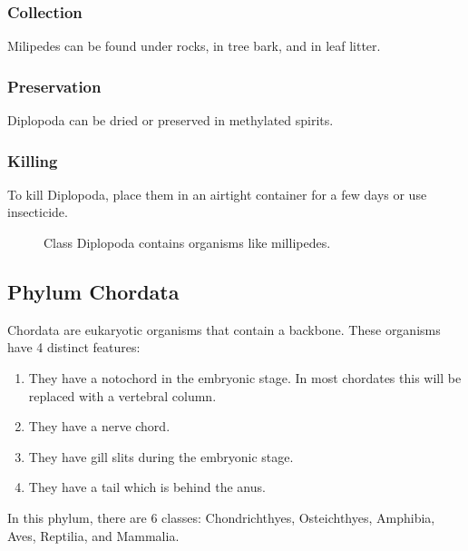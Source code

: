 \subsubsection{Collection}
Milipedes can be found under rocks, in tree bark, and in leaf litter.

\subsubsection{Preservation} 
Diplopoda can be dried or preserved in methylated spirits.

\subsubsection{Killing}
To kill Diplopoda, place them in an airtight container for a few days or use insecticide.
		
\begin{figure}[h]
\begin{center}
\def\svgwidth{6cm}

\caption{Class Diplopoda contains organisms like millipedes.}
\label{fig:Diplopoda}
\end{center}
\end{figure}


\subsection{Phylum Chordata}
Chordata are eukaryotic organisms that contain a backbone. These organisms have 4 distinct features:
\begin{enumerate}
\item{They have a notochord in the embryonic stage. In most chordates this will be replaced with a vertebral column.}
\item{They have a nerve chord.}
\item{They have gill slits during the embryonic stage.}
\item{They have a tail which is behind the anus.}
\end{enumerate}

In this phylum, there are 6 classes: Chondrichthyes, Osteichthyes, Amphibia, Aves, Reptilia, and Mammalia.

